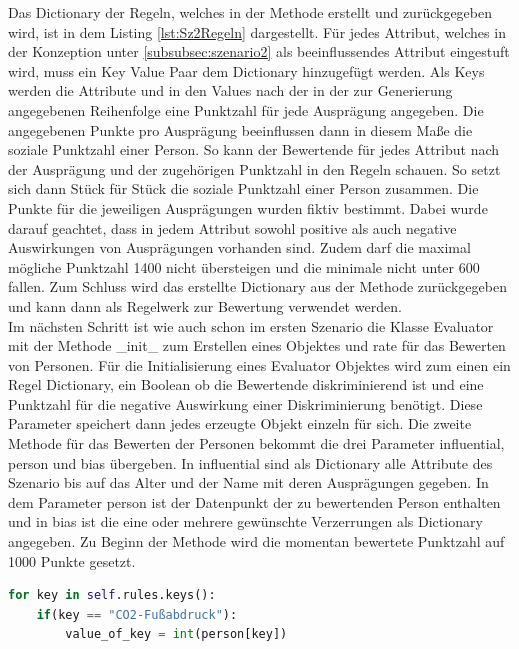 \begin{onehalfspace}
Das Dictionary der Regeln, welches in der Methode erstellt und zurückgegeben wird, ist in dem Listing \ref{lst:Sz2Regeln} dargestellt. Für jedes Attribut, welches in der Konzeption unter \ref{subsubsec:szenario2} als beeinflussendes Attribut eingestuft wird, muss ein Key Value Paar dem Dictionary hinzugefügt werden. Als Keys werden die Attribute und in den Values nach der in der zur Generierung angegebenen Reihenfolge eine Punktzahl für jede Ausprägung angegeben. Die angegebenen Punkte pro Ausprägung beeinflussen dann in diesem Maße die soziale Punktzahl einer Person. So kann der Bewertende für jedes Attribut nach der Ausprägung und der zugehörigen Punktzahl in den Regeln schauen. So setzt sich dann Stück für Stück die soziale Punktzahl einer Person zusammen. Die Punkte für die jeweiligen Ausprägungen wurden fiktiv bestimmt. Dabei wurde darauf geachtet, dass in jedem Attribut sowohl positive als auch negative Auswirkungen von Ausprägungen vorhanden sind. Zudem darf die maximal mögliche Punktzahl 1400 nicht übersteigen und die minimale nicht unter 600 fallen. Zum Schluss wird das erstellte Dictionary aus der Methode zurückgegeben und kann dann als Regelwerk zur Bewertung verwendet werden.\\
Im nächsten Schritt ist wie auch schon im ersten Szenario die Klasse \glqq{}Evaluator\grqq{} mit der Methode \glqq{}\_init\_\grqq{} zum Erstellen eines Objektes und \glqq{}rate\grqq{} für das Bewerten von Personen. Für die Initialisierung eines \glqq{}Evaluator\grqq{} Objektes wird zum einen ein Regel Dictionary, ein Boolean ob die Bewertende diskriminierend ist und eine Punktzahl für die negative Auswirkung einer Diskriminierung benötigt. Diese Parameter speichert dann jedes erzeugte Objekt einzeln für sich. Die zweite Methode für das Bewerten der Personen bekommt die drei Parameter \glqq{}influential\grqq{}, \glqq{}person\grqq{} und \glqq{}bias\grqq{} übergeben. In \glqq{}influential\grqq{} sind als Dictionary alle Attribute des Szenario bis auf das Alter und der Name mit deren Ausprägungen gegeben. In dem Parameter \glqq{}person\grqq{} ist der Datenpunkt der zu bewertenden Person enthalten und in \glqq{}bias\grqq{} ist die eine oder mehrere gewünschte Verzerrungen als Dictionary angegeben. Zu Beginn der Methode wird die momentan bewertete Punktzahl auf 1000 Punkte gesetzt.
\begin{lstlisting}[language=Python,label={lst:Sz2Rate},caption=Codeausschnitt der Funktion zum Bewerten von Personen]
for key in self.rules.keys():
    if(key == "CO2-Fußabdruck"):
        value_of_key = int(person[key])

\end{lstlisting}
\end{onehalfspace}
